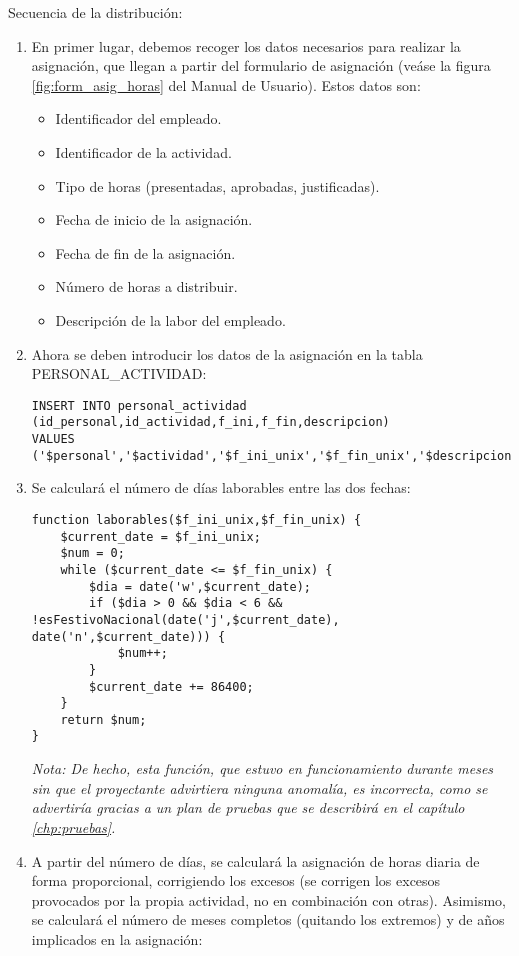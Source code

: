 Secuencia de la distribución:
\begin{enumerate}
\item En primer lugar, debemos recoger los datos necesarios para realizar la
asignación, que llegan a partir del formulario de asignación (veáse la figura
\ref{fig:form_asig_horas} del Manual de Usuario). Estos datos son:

  \begin{itemize}
  \item Identificador del empleado.
  \item Identificador de la actividad.
  \item Tipo de horas (presentadas, aprobadas, justificadas).
  \item Fecha de inicio de la asignación.
  \item Fecha de fin de la asignación.
  \item Número de horas a distribuir.
  \item Descripción de la labor del empleado.
  \end{itemize}

\item Ahora se deben introducir los datos de la asignación en la tabla
PERSONAL\_ACTIVIDAD:

\begin{lstlisting}
INSERT INTO personal_actividad
(id_personal,id_actividad,f_ini,f_fin,descripcion)
VALUES
('$personal','$actividad','$f_ini_unix','$f_fin_unix','$descripcion')";
\end{lstlisting}

\item Se calculará el número de días laborables entre las dos fechas:

\begin{lstlisting}
function laborables($f_ini_unix,$f_fin_unix) {
	$current_date = $f_ini_unix;
	$num = 0;
	while ($current_date <= $f_fin_unix) {
		$dia = date('w',$current_date);
		if ($dia > 0 && $dia < 6 &&
!esFestivoNacional(date('j',$current_date), date('n',$current_date))) {
			$num++;
		}
		$current_date += 86400;
	}
	return $num;
}
\end{lstlisting}

\textit{Nota: De hecho, esta función, que estuvo en funcionamiento durante meses
sin que el proyectante advirtiera ninguna anomalía, es incorrecta, como se
advertiría gracias a un plan de pruebas que se describirá en el capítulo
\ref{chp:pruebas}.}

\item A partir del número de días, se calculará la asignación de horas diaria
de forma proporcional, corrigiendo los excesos (se corrigen los excesos
provocados por la propia actividad, no en combinación con otras). Asimismo, se
calculará el número de meses completos (quitando los extremos) y de años
implicados en la asignación:


\end{enumerate}
